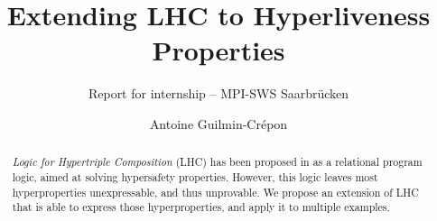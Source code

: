 \documentclass[acmsmall,screen,nonacm,appendix]{acmart}
\title{Extending LHC to Hyperliveness Properties}
\subtitle{Report for internship -- MPI-SWS Saarbrücken}
\author{Antoine Guilmin-Crépon}
\affiliation{%
  \institution{ENS Paris-Saclay}
  \city{Gif-Sur-Yvette}
  \country{France}
}
\begin{document}
\begin{abstract}
  \emph{Logic for Hypertriple Composition} (LHC) has been proposed in \citet{DOsualdo22} as a relational program logic, aimed at solving hypersafety properties. However, this logic leaves most hyperproperties unexpressable, and thus unprovable. We propose an extension of LHC that is able to express those hyperproperties, and apply it to multiple examples. 
\end{abstract}

\maketitle









\appendix


\newpage


\end{document}
